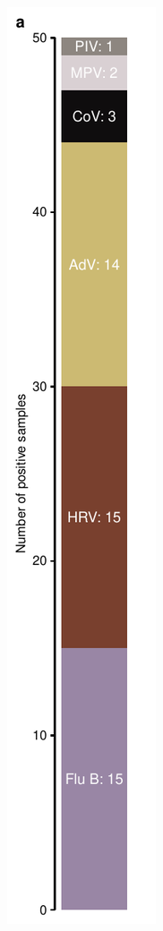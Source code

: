 \documentclass[fleqn,11pt]{wlscirep}
\begin{document}
\begin{figure}[!htpb]
    \centering
    \includegraphics{../../results/mol-data/saliva-distribution.pdf}\hspace{.5cm}

\end{figure}
\end{document}
